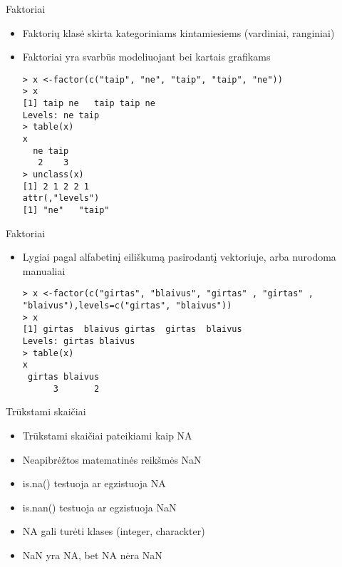 \documentclass[11pt,xcolor=table]{beamer}
\begin{document}

\begin{frame}[fragile]{Faktoriai}
\begin{itemize}
\item Faktorių klasė skirta kategoriniams kintamiesiems (vardiniai, ranginiai)
\item Faktoriai yra svarbūs modeliuojant bei kartais grafikams

\begin{lstlisting}
> x <-factor(c("taip", "ne", "taip", "taip", "ne"))
> x
[1] taip ne   taip taip ne  
Levels: ne taip
> table(x)
x
  ne taip 
   2    3 
> unclass(x)
[1] 2 1 2 2 1
attr(,"levels")
[1] "ne"   "taip"
\end{lstlisting}
\end{itemize}
\end{frame}


\begin{frame}[fragile]{Faktoriai}
\begin{itemize}
\item Lygiai pagal alfabetinį eiliškumą pasirodantį vektoriuje, arba nurodoma manualiai

\begin{lstlisting}
> x <-factor(c("girtas", "blaivus", "girtas" , "girtas" , "blaivus"),levels=c("girtas", "blaivus"))
> x
[1] girtas  blaivus girtas  girtas  blaivus
Levels: girtas blaivus
> table(x)
x
 girtas blaivus 
      3       2  
\end{lstlisting}
\end{itemize}
\end{frame}


\begin{frame}[fragile]{Trūkstami skaičiai}
\begin{itemize}
\item Trūkstami skaičiai pateikiami kaip NA
\item Neapibrėžtos matematinės reikšmės NaN
\item is.na() testuoja ar egzistuoja NA
\item is.nan() testuoja ar egzistuoja NaN
\item NA gali turėti klases (integer, charackter)
\item NaN yra NA, bet NA nėra NaN
\end{itemize}
\end{frame}
\end{document}
